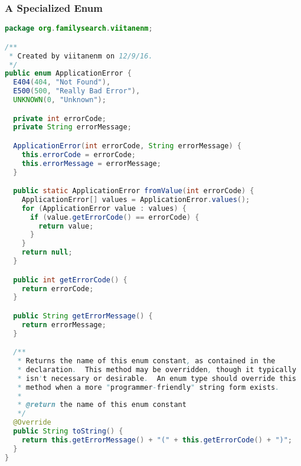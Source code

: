 \subsubsection{A Specialized Enum}\label{App:AppendixISpecialEnum}
\begin{lstlisting}[language=Java]
package org.familysearch.viitanenm;

/**
 * Created by viitanenm on 12/9/16.
 */
public enum ApplicationError {
  E404(404, "Not Found"),
  E500(500, "Really Bad Error"),
  UNKNOWN(0, "Unknown");

  private int errorCode;
  private String errorMessage;

  ApplicationError(int errorCode, String errorMessage) {
    this.errorCode = errorCode;
    this.errorMessage = errorMessage;
  }

  public static ApplicationError fromValue(int errorCode) {
    ApplicationError[] values = ApplicationError.values();
    for (ApplicationError value : values) {
      if (value.getErrorCode() == errorCode) {
        return value;
      }
    }
    return null;
  }

  public int getErrorCode() {
    return errorCode;
  }

  public String getErrorMessage() {
    return errorMessage;
  }

  /**
   * Returns the name of this enum constant, as contained in the
   * declaration.  This method may be overridden, though it typically
   * isn't necessary or desirable.  An enum type should override this
   * method when a more "programmer-friendly" string form exists.
   *
   * @return the name of this enum constant
   */
  @Override
  public String toString() {
    return this.getErrorMessage() + "(" + this.getErrorCode() + ")";
  }
}
\end{lstlisting}